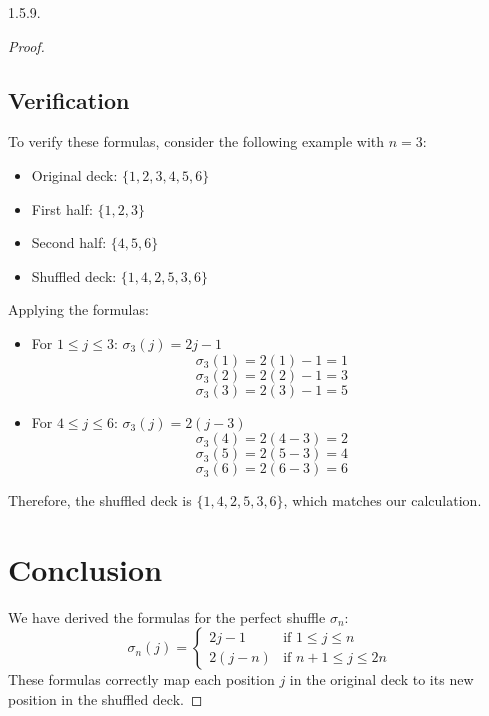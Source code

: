 \documentclass[12pt]{amsart}
\theoremstyle{definition}
\numberwithin{equation}{section}
\begin{document}
\begin{exercise}{1.5.9.}
\begin{proof}
        \subsection*{Verification}
    
        To verify these formulas, consider the following example with \(n = 3\):
    
        \begin{itemize}[label=--]
            \item Original deck: \(\{1, 2, 3, 4, 5, 6\}\)
            \item First half: \(\{1, 2, 3\}\)
            \item Second half: \(\{4, 5, 6\}\)
            \item Shuffled deck: \(\{1, 4, 2, 5, 3, 6\}\)
        \end{itemize}
    
        \noindent Applying the formulas:
        \begin{itemize}[label=--]
            \item For \(1 \leq j \leq 3\): \(\sigma_3(j) = 2j - 1\)
            \[
            \sigma_3(1) = 2(1) - 1 = 1
            \]
            \[
            \sigma_3(2) = 2(2) - 1 = 3
            \]
            \[
            \sigma_3(3) = 2(3) - 1 = 5
            \]
            \item For \(4 \leq j \leq 6\): \(\sigma_3(j) = 2(j - 3)\)
            \[
            \sigma_3(4) = 2(4 - 3) = 2
            \]
            \[
            \sigma_3(5) = 2(5 - 3) = 4
            \]
            \[
            \sigma_3(6) = 2(6 - 3) = 6
            \]
        \end{itemize}
    
        \noindent Therefore, the shuffled deck is \(\{1, 4, 2, 5, 3, 6\}\), which matches our calculation.
    
        \section*{Conclusion}
    
        We have derived the formulas for the perfect shuffle \(\sigma_n\):
        \[
        \sigma_n(j) = 
        \begin{cases} 
        2j - 1 & \text{if } 1 \leq j \leq n \\
        2(j - n) & \text{if } n + 1 \leq j \leq 2n
        \end{cases}
        \]
        These formulas correctly map each position \(j\) in the original deck to its new position in the shuffled deck.
    
        \end{proof}
    \end{exercise}
    
\end{document}
